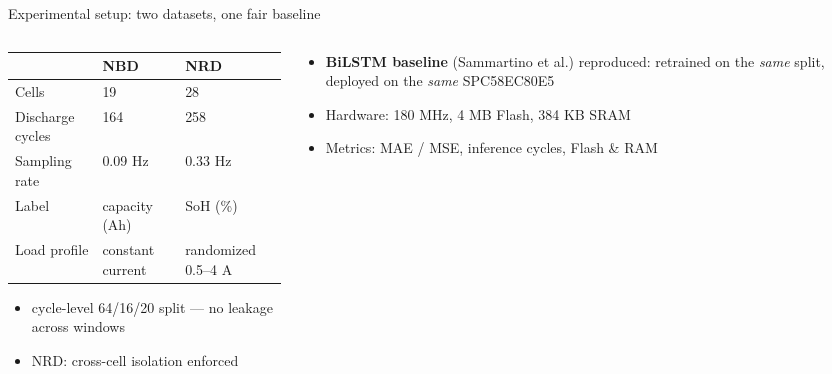 \documentclass[11pt,aspectratio=169]{beamer}
\begin{document}
\begin{frame}{Experimental setup: two datasets, one fair baseline}
  \begin{columns}[T]
    \begin{column}{0.56\textwidth}
      {\small
      \begin{tabular}{@{}lll@{}}
        \toprule
        & \textbf{NBD} & \textbf{NRD}\\
        \midrule
        Cells & 19 & 28\\
        Discharge cycles & 164 & 258\\
        Sampling rate & 0.09 Hz & 0.33 Hz\\
        Label & capacity (Ah) & SoH (\%) \\
        Load profile & constant current & randomized 0.5--4 A\\
        \bottomrule
      \end{tabular}}
      \vspace{0.5em}
      \begin{itemize}
        \item cycle-level 64/16/20 split --- no leakage across windows
        \item NRD: cross-cell isolation enforced
      \end{itemize}
    \end{column}
    \begin{column}{0.42\textwidth}
      \begin{itemize}
        \item \textbf{BiLSTM baseline} (Sammartino et al.) reproduced:
              retrained on the \emph{same} split, deployed on the \emph{same}
              SPC58EC80E5
        \item Hardware: 180 MHz, 4 MB Flash, 384 KB SRAM
        \item Metrics: MAE / MSE, inference cycles, Flash \& RAM
      \end{itemize}
    \end{column}
  \end{columns}
\end{frame}
\end{document}

